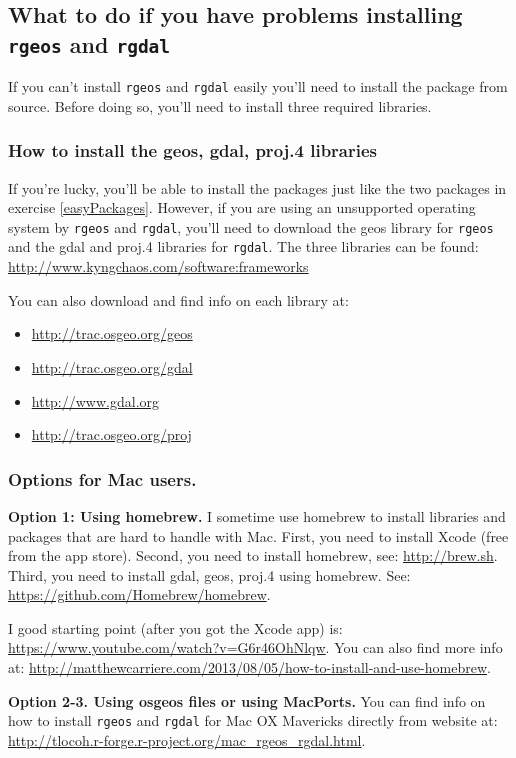 \documentclass[11pt, oneside]{article}   	%
\begin{document}
\subsection{What to do if you have problems installing \texttt{rgeos} and \texttt{rgdal}}
If you can't install \texttt{rgeos} and \texttt{rgdal} easily you'll need to install the package from source. Before doing so, you'll need to install three required libraries.

\subsubsection{How to install the geos, gdal, proj.4 libraries}

If you're lucky, you'll be able to install the packages just like the two packages in exercise \ref{easyPackages}. However, if you are using an unsupported operating system by \texttt{rgeos} and \texttt{rgdal}, you'll need to download the geos library for \texttt{rgeos} and the gdal and proj.4 libraries for \texttt{rgdal}. The three libraries can be found: \url{http://www.kyngchaos.com/software:frameworks}

You can also download and find info on each library at:
\begin{itemize}
	\item \url{http://trac.osgeo.org/geos}
	\item \url{http://trac.osgeo.org/gdal}
	\item \url{http://www.gdal.org}
	\item \url{http://trac.osgeo.org/proj}
\end{itemize}

\subsubsection{Options for Mac users.}
\textbf{Option 1: Using homebrew.} I sometime use homebrew to install libraries and packages that are hard to handle with Mac. First, you need to install Xcode (free from the app store). Second, you need to install homebrew, see: \url{http://brew.sh}. Third, you need to install gdal, geos, proj.4 using homebrew. See: \url{https://github.com/Homebrew/homebrew}. 

I good starting point (after you got the Xcode app) is: \url{https://www.youtube.com/watch?v=G6r46OhNlqw}. You can also find more info at: \url{http://matthewcarriere.com/2013/08/05/how-to-install-and-use-homebrew}.

\textbf{Option 2-3. Using osgeos files or using MacPorts.} You can find info on how to install \texttt{rgeos} and \texttt{rgdal} for Mac OX Mavericks directly from website at: \url{http://tlocoh.r-forge.r-project.org/mac_rgeos_rgdal.html}.
\end{document}
